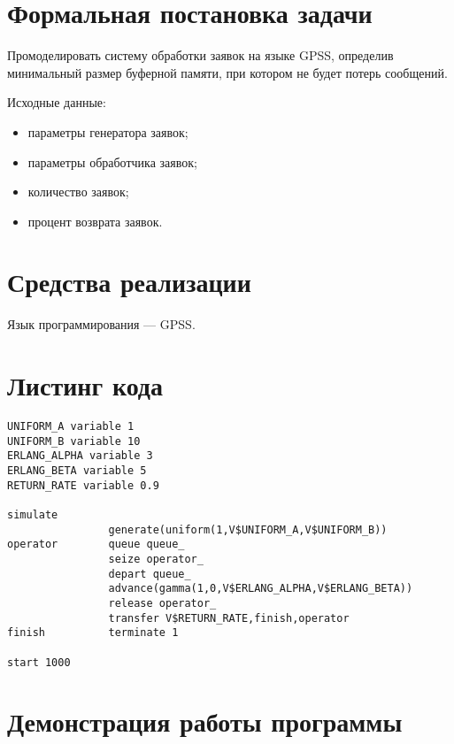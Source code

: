 \section*{Формальная постановка задачи}

Промоделировать систему обработки заявок на языке GPSS, определив минимальный размер буферной памяти, при котором не будет потерь сообщений.

Исходные данные:
\begin{itemize}
	\item параметры генератора заявок;
	\item параметры обработчика заявок;
	\item количество заявок;
	\item процент возврата заявок.
\end{itemize}


\section*{Средства реализации}

Язык программирования --- GPSS.


\section*{Листинг кода}

\begin{lstlisting}
UNIFORM_A variable 1
UNIFORM_B variable 10
ERLANG_ALPHA variable 3
ERLANG_BETA variable 5
RETURN_RATE variable 0.9

simulate
				generate(uniform(1,V$UNIFORM_A,V$UNIFORM_B))
operator		queue queue_
				seize operator_	
				depart queue_	 
				advance(gamma(1,0,V$ERLANG_ALPHA,V$ERLANG_BETA))		
				release operator_
				transfer V$RETURN_RATE,finish,operator
finish			terminate 1	
	 
start 1000
\end{lstlisting}

\clearpage

\section*{Демонстрация работы программы}

